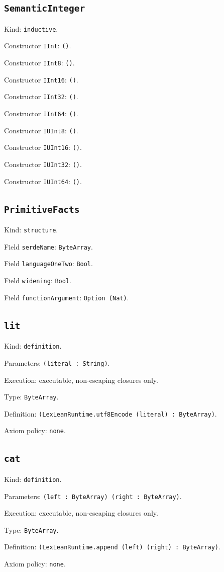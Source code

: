 \documentclass[11pt]{article}
\begin{document}
\subsection*{\texttt{SemanticInteger}}
\noindent Kind: \texttt{inductive}.\par
\noindent Constructor \texttt{IInt}: \texttt{()}.\par
\noindent Constructor \texttt{IInt8}: \texttt{()}.\par
\noindent Constructor \texttt{IInt16}: \texttt{()}.\par
\noindent Constructor \texttt{IInt32}: \texttt{()}.\par
\noindent Constructor \texttt{IInt64}: \texttt{()}.\par
\noindent Constructor \texttt{IUInt8}: \texttt{()}.\par
\noindent Constructor \texttt{IUInt16}: \texttt{()}.\par
\noindent Constructor \texttt{IUInt32}: \texttt{()}.\par
\noindent Constructor \texttt{IUInt64}: \texttt{()}.\par
\subsection*{\texttt{PrimitiveFacts}}
\noindent Kind: \texttt{structure}.\par
\noindent Field \texttt{serdeName}: \texttt{ByteArray}.\par
\noindent Field \texttt{languageOneTwo}: \texttt{Bool}.\par
\noindent Field \texttt{widening}: \texttt{Bool}.\par
\noindent Field \texttt{functionArgument}: \texttt{Option (Nat)}.\par
\subsection*{\texttt{lit}}
\noindent Kind: \texttt{definition}.\par
\noindent Parameters: \texttt{(literal : String)}.\par
\noindent Execution: executable, non-escaping closures only.\par
\noindent Type: \texttt{ByteArray}.\par
\noindent Definition: \texttt{(LexLeanRuntime.utf8Encode (literal) : ByteArray)}.\par
\noindent Axiom policy: \texttt{none}.\par
\subsection*{\texttt{cat}}
\noindent Kind: \texttt{definition}.\par
\noindent Parameters: \texttt{(left : ByteArray) (right : ByteArray)}.\par
\noindent Execution: executable, non-escaping closures only.\par
\noindent Type: \texttt{ByteArray}.\par
\noindent Definition: \texttt{(LexLeanRuntime.append (left) (right) : ByteArray)}.\par
\noindent Axiom policy: \texttt{none}.\par
\end{document}
